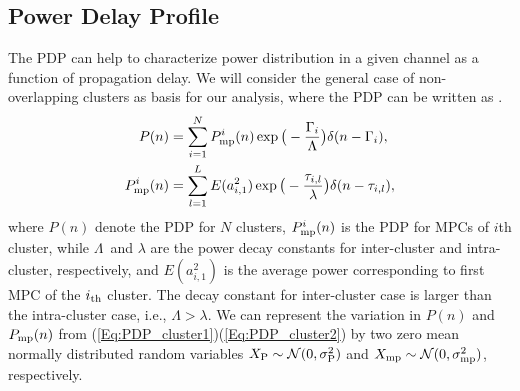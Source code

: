 \documentclass[conference]{IEEEtran}
\begin{document}
\subsection{Power Delay Profile}
The PDP can help to characterize power distribution in a given channel as a function of propagation delay. We will consider the general case of non-overlapping clusters as basis for our analysis, where the PDP can be written as \cite{molisch00,Saleh}.
\vspace{-0.1 cm}
\begin{align}
\vspace{-0.8 cm}
P(n) &= \sum_{i=1}^{N}P_{\rm mp}^{i}(n)\exp\big(-\frac{\Gamma_i}{\Lambda}\big)\delta(n-\Gamma_i), \label{Eq:PDP_cluster1}\\
P_{\rm mp}^{i}(n) &= \sum_{l=1}^{L} E(a_{i,1}^2)\exp\big(-\frac{\tau_{i,l}}{\lambda}\big)\delta(n-\tau_{i,l}) \label{Eq:PDP_cluster2} , 
\end{align}
where  $P(n)$ denote the PDP for $N$ clusters, $P_{\rm mp}^{i}(n) $ is the PDP for MPCs of $i$th cluster, while $\Lambda$~and $\lambda$ are the power decay constants for inter-cluster and intra-cluster, respectively, and $ E(a_{i,1}^2) $ is the average power corresponding to first MPC of the $i_{\rm th}$ cluster. The decay constant for inter-cluster case is larger than the intra-cluster case, i.e., $\Lambda>\lambda$. We can represent the variation in $P(n)$  and $P_{\rm mp}(n)$ from (\ref{Eq:PDP_cluster1})(\ref{Eq:PDP_cluster2}) by two zero mean normally distributed random variables $X_{\rm P}\sim\mathcal{N}(0,\sigma_{\rm P}^2)$ and $X_{\rm mp}\sim\mathcal{N}(0,\sigma_{\rm mp}^2)$, respectively.

\end{document}
